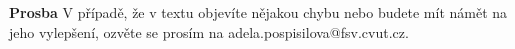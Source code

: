 \documentclass[12pt,fleqn]{article}
\begin{document}
\vspace{2em}

\textbf{Prosba} V případě, že v textu objevíte nějakou chybu nebo
budete mít námět
na jeho vylepšení, ozvěte se prosím na adela.pospisilova@fsv.cvut.cz. \\ \\






\end{document}
